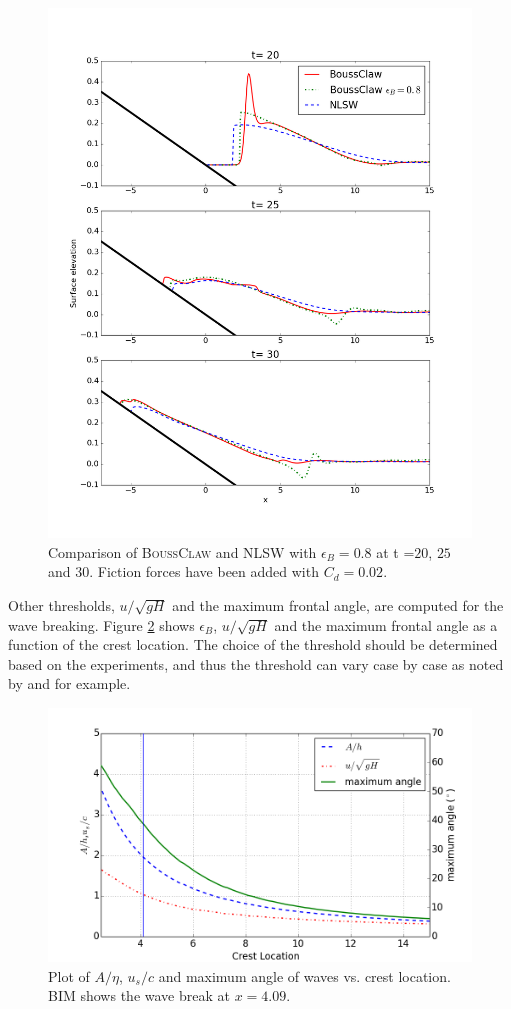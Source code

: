\documentclass[review]{elsarticle}
\newcommand{\BoussClaw}{\textsc{BoussClaw} }
\begin{document}
\begin{figure}[tbh!]
\centering
\includegraphics[width=.7\textwidth]{_fig/bim_boussclaw_etaB8}
\caption{Comparison of \BoussClaw and NLSW 
with $\epsilon_B=0.8$ at t =$20$, $25$ and $30$.
Fiction forces have been added with $C_d=0.02$.}
\label{fig:boussclaw_th08}
\end{figure}

Other thresholds, $u/\sqrt{gH}$ and the maximum frontal angle,
are computed for the wave breaking.  
Figure \ref{fig:wave_break_criteria} shows 
$\epsilon_B$, $u/\sqrt{gH}$ and the maximum frontal angle 
as a function of the crest location.
The choice of the threshold should be determined based on the experiments,
and thus the threshold can vary case by case as noted
by \cite{lynett2006nearshore} and \cite{matsuyama2007study} 
for example. 

\begin{figure}[tbh!]
\centering
\includegraphics[width=.7\textwidth]{_fig/wave_break}
\caption{Plot of $A/\eta$, $u_s/c$ and maximum angle of waves vs. crest location. 
BIM shows the wave break at $x=4.09$. }
\label{fig:wave_break_criteria}
\end{figure}
\end{document}
